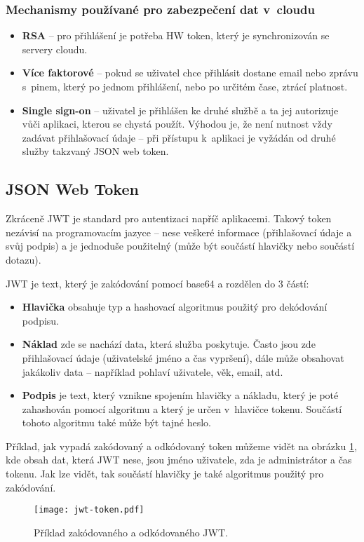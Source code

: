 \subsubsection{Mechanismy používané pro zabezpečení dat v~cloudu}
\begin{itemize}
\item \textbf{RSA} -- pro přihlášení je potřeba HW token, který je synchronizován se servery cloudu.
\item \textbf{Více faktorové} -- pokud se uživatel chce přihlásit dostane email nebo zprávu s~pinem, který po jednom přihlášení, nebo po určitém čase, ztrácí platnost.
\item \textbf{Single sign-on} -- uživatel je přihlášen ke druhé službě a ta jej autorizuje vůči aplikaci, kterou se chystá použít. Výhodou je, že není nutnost vždy zadávat přihlašovací údaje -- při přístupu k~aplikaci je vyžádán od druhé služby takzvaný JSON web token. \cite{cloud-security}
\end{itemize}

\subsection{JSON Web Token}
\par Zkráceně JWT je standard pro autentizaci napříč aplikacemi. Takový token nezávisí na programovacím jazyce -- nese veškeré informace (přihlašovací údaje a svůj podpis) a je jednoduše použitelný (může být součástí hlavičky nebo součástí dotazu). \cite{scotch-jwt}

\par JWT je text, který je zakódování pomocí base64 a rozdělen do 3 částí:
\begin{itemize}
\item \textbf{Hlavička} obsahuje typ a hashovací algoritmus použitý pro dekódování podpisu.
\item \textbf{Náklad} zde se nachází data, která služba poskytuje. Často jsou zde přihlašovací údaje (uživatelské jméno a čas vypršení), dále může obsahovat jakákoliv data -- například pohlaví uživatele, věk, email, atd.
\item \textbf{Podpis} je text, který vznikne spojením hlavičky a nákladu, který je poté zahashován pomocí algoritmu a který je určen v~hlavičce tokenu. Součástí tohoto algoritmu také může být tajné heslo. \cite{rfc-jwt}
\end{itemize}

\par Příklad, jak vypadá zakódovaný a odkódovaný token můžeme vidět na obrázku \ref{jwt-token-fig}, kde obsah dat, která JWT nese, jsou jméno uživatele, zda je administrátor a čas tokenu. Jak lze vidět, tak součástí hlavičky je také algoritmus použitý pro zakódování.

\begin{figure}[htp]
\centering
\texttt{[image: jwt-token.pdf]}
\caption{Příklad zakódovaného a odkódovaného JWT.}
\label{jwt-token-fig}
\end{figure}
